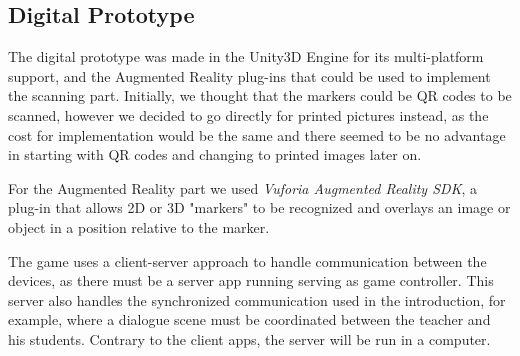 \documentclass[runningheads]{llncs}
\begin{document}
\subsection{Digital Prototype}
\par The digital prototype was made in the Unity3D Engine for its multi-platform support, and the Augmented Reality plug-ins that could be used to implement the scanning part. Initially, we thought that the markers could be QR codes to be scanned, however we decided to go directly for printed pictures instead, as the cost for implementation would be the same and there seemed to be no advantage in starting with QR codes and changing to printed images later on.
\par For the Augmented Reality part we used \textit{Vuforia Augmented Reality SDK}, a plug-in that allows 2D or 3D "markers" to be recognized and overlays an image or object in a position relative to the marker.
\par The game uses a client-server approach to handle communication between the devices, as there must be a server app running serving as game controller. This server also handles the synchronized communication used in the introduction, for example, where a dialogue scene must be coordinated between the teacher and his students. Contrary to the client apps, the server will be run in a computer.
\end{document}
